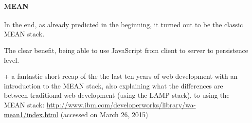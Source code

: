 		\paragraph{MEAN}
			In the end, as already predicted in the beginning, it turned out to be the classic MEAN stack. 

			The clear benefit, being able to use JavaScript from client to server to persistence level. 


			+ a fantastic short recap of the the last ten years of web development with an introduction to the MEAN stack, also explaining what the differences are between traditional web development (using the LAMP stack), to using the MEAN stack:
			\url{http://www.ibm.com/developerworks/library/wa-mean1/index.html} (accessed on March 26, 2015)



\clearpage

\label{sec:implementation:modeling}





